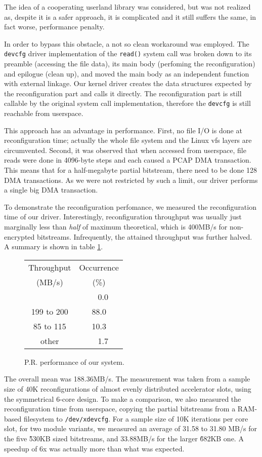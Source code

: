 The idea of a cooperating userland library was considered, but was not realized as, despite it is a safer approach,
it is complicated and it still suffers the same, in fact worse, performance penalty.

In order to bypass this obstacle, a not so clean workaround was employed. The \texttt{devcfg} driver implementation of the \texttt{read()} system call
was broken down to its preamble (accessing the file data), its main body (perfoming the reconfiguration) and epilogue (clean up), and moved the main body
as an independent function with external linkage. Our kernel driver creates the data structures expected by the reconfiguration part and calls it directly.
The reconfiguration part is still callable by the original system call implementation, therefore the \texttt{devcfg} is still reachable from userspace.

This approach has an advantage in performance. First, no file I/O is done at reconfiguration time; actually the whole 
file system and the Linux \gls{vfs} layers are circumvented. Second, it was observed that when accessed from userspace,
file reads were done in 4096-byte steps and each caused a PCAP DMA transaction. This means that for a half-megabyte partial bitstream,
there need to be done 128 DMA transactions. As we were not restricted by such a limit, our driver performs a single big DMA transaction.

To demonstrate the reconfiguration perfomance, we measured the reconfiguration time of our driver. Interestingly, reconfiguration
throughput was usually just marginally less than {\em half} of maximum theoretical, which is 400MB/s for non-encrypted bitstreams.
Infrequently, the attained throughput was further halved. A summary is shown in table \ref{tab:pr-perf}.

\begin{figure}[H]
\centering
\begin{tabular}{cc}
\toprule
Throughput	& Occurrence\\
(MB/s)		& (\%)	\\
\midrule
\geq 200 	& ~~0.0	\\
199 to 200	& 88.0	\\
85 to 115	& 10.3	\\
other		& ~~1.7	\\
\bottomrule
\end{tabular}
\caption{P.R. performance of our system.}
\label{tab:pr-perf}
\end{figure}

The overall mean was 188.36MB/s.
The measurement was taken from a sample size of 40K reconfigurations of almost evenly distributed accelerator slots, using the symmetrical 6-core design.
To make a comparison, we also measured the reconfiguration time from userspace,
copying the partial bitstreams from a RAM-based filesystem to \texttt{/dev/xdevcfg}.
For a sample size of 10K iterations per core slot, for two module variants, we measured an average of 31.58 to 31.80 MB/s for the five \~530KB sized bitstreams,
and 33.88MB/s for the larger \~682KB one. A speedup of 6x was actually more than what was expected.




